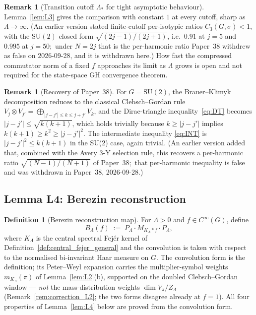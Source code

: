 \documentclass[11pt,a4paper]{article}
\theoremstyle{plain}
\theoremstyle{definition}
\newtheorem{definition}[theorem]{Definition}
\newtheorem{remark}[theorem]{Remark}
\newcommand{\Lammax}{\Lambda}
\newcommand{\SU}{\mathrm{SU}}
\newcommand{\KS}{K}
\begin{document}
\begin{remark}[Transition cutoff $\Lammax_*$ for tight
asymptotic behaviour]\label{rem:lambda_star}
Lemma~\ref{lem:L3} gives the comparison with constant $1$ at every
cutoff, sharp as $\Lammax \to \infty$.  (An earlier version stated
finite-cutoff per-isotypic ratios $C_3(G, \sigma) < 1$, with the
$\SU(2)$ closed form $\sqrt{(2j-1)/(2j+1)}$, i.e.\ $0.91$ at $j = 5$ and
$0.995$ at $j = 50$;\ under $N = 2j$ that is the per-harmonic ratio
Paper~38 withdrew as false on 2026-09-28, and it is withdrawn here.)
How fast the compressed commutator norm of a fixed $f$ approaches its
limit as $\Lammax$ grows is open and not required for the state-space
GH convergence theorem.
\end{remark}

\begin{remark}[Recovery of Paper~38]\label{rem:L3_paper38}
For $G = \SU(2)$, the Brauer--Klimyk decomposition reduces to the
classical Clebsch--Gordan rule
$V_j \otimes V_{j'} = \bigoplus_{|j - j'| \le k \le j + j'} V_k$, and the
Dirac-triangle inequality~\eqref{eq:DT} becomes $|j - j'| \le
\sqrt{k(k+1)}$, which holds trivially because $k \ge |j - j'|$ implies
$k(k+1) \ge k^2 \ge |j - j'|^2$. The intermediate inequality
\eqref{eq:INT} is $|j - j'|^2 \le k(k+1)$ in the SU(2) case, again
trivial.  (An earlier version added that, combined with the Avery 3-Y
selection rule, this recovers a per-harmonic ratio
$\sqrt{(N-1)/(N+1)}$ of Paper~38;\ that per-harmonic inequality is false
and was withdrawn in Paper~38, 2026-09-28.)
\end{remark}

\subsection{Lemma L4: Berezin reconstruction}\label{sec:L4}

\begin{definition}[Berezin reconstruction map]\label{def:berezin_general}
For $\Lammax > 0$ and $f \in C^\infty(G)$, define
\begin{equation}\label{eq:B_def_general}
   B_\Lammax(f) \;:=\; P_\Lammax \cdot M_{\KS_\Lammax * f} \cdot P_\Lammax,
\end{equation}
where $\KS_\Lammax$ is the central spectral Fej\'er kernel of
Definition~\ref{def:central_fejer_general} and the convolution is taken
with respect to the normalised bi-invariant Haar measure on $G$.
The convolution form is the definition; its Peter--Weyl expansion
carries the multiplier-symbol weights $m_{\KS_\Lammax}(\pi)$ of
Lemma~\ref{lem:L2}(b), supported on the doubled Clebsch--Gordan
window — \emph{not} the mass-distribution weights
$\dim V_\pi / Z_\Lammax$ (Remark~\ref{rem:correction_L2}; the two
forms disagree already at $f = 1$). All four properties of
Lemma~\ref{lem:L4} below are proved from the convolution form.
\end{definition}
\end{document}
